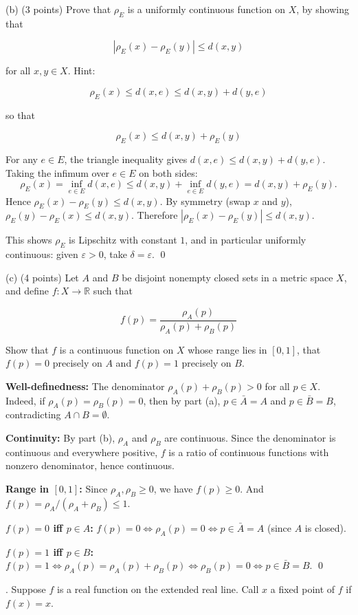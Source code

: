 \documentclass[10pt]{article}
\newcommand{\eps}{\varepsilon}
\newenvironment{solution}{%
  \par\medskip\noindent{\color{red}\textbf{Solution.}}\color{red}\;}%
  {\par\medskip}
\begin{document}
(b) (3 points) Prove that $\rho_{E}$ is a uniformly continuous function on $X$, by showing that

$$
\left|\rho_{E}(x)-\rho_{E}(y)\right| \leq d(x, y)
$$

for all $x, y \in X$. Hint:

$$
\rho_{E}(x) \leq d(x, e) \leq d(x, y)+d(y, e)
$$

so that

$$
\rho_{E}(x) \leq d(x, y)+\rho_{E}(y)
$$

\begin{solution}
For any $e \in E$, the triangle inequality gives $d(x,e) \leq d(x,y) + d(y,e)$. Taking the infimum over $e \in E$ on both sides:
$$
\rho_E(x) = \inf_{e \in E} d(x,e) \leq d(x,y) + \inf_{e\in E} d(y,e) = d(x,y) + \rho_E(y).
$$
Hence $\rho_E(x) - \rho_E(y) \leq d(x,y)$. By symmetry (swap $x$ and $y$), $\rho_E(y) - \rho_E(x) \leq d(x,y)$. Therefore $|\rho_E(x) - \rho_E(y)| \leq d(x,y)$.

This shows $\rho_E$ is Lipschitz with constant $1$, and in particular uniformly continuous: given $\eps > 0$, take $\delta = \eps$. \qed
\end{solution}

(c) (4 points) Let $A$ and $B$ be disjoint nonempty closed sets in a metric space $X$, and define $f: X \rightarrow \mathbb{R}$ such that

$$
f(p)=\frac{\rho_{A}(p)}{\rho_{A}(p)+\rho_{B}(p)}
$$

Show that $f$ is a continuous function on $X$ whose range lies in $[0,1]$, that $f(p)=0$ precisely on $A$ and $f(p)=1$ precisely on $B$.

\begin{solution}
\textbf{Well-definedness:} The denominator $\rho_A(p) + \rho_B(p) > 0$ for all $p \in X$. Indeed, if $\rho_A(p) = \rho_B(p) = 0$, then by part (a), $p \in \bar{A} = A$ and $p \in \bar{B} = B$, contradicting $A \cap B = \emptyset$.

\textbf{Continuity:} By part (b), $\rho_A$ and $\rho_B$ are continuous. Since the denominator is continuous and everywhere positive, $f$ is a ratio of continuous functions with nonzero denominator, hence continuous.

\textbf{Range in $[0,1]$:} Since $\rho_A, \rho_B \geq 0$, we have $f(p) \geq 0$. And $f(p) = \rho_A/(\rho_A+\rho_B) \leq 1$.

\textbf{$f(p) = 0$ iff $p \in A$:} $f(p) = 0 \iff \rho_A(p) = 0 \iff p \in \bar{A} = A$ (since $A$ is closed).

\textbf{$f(p) = 1$ iff $p \in B$:} $f(p) = 1 \iff \rho_A(p) = \rho_A(p)+\rho_B(p) \iff \rho_B(p) = 0 \iff p \in \bar{B} = B$. \qed
\end{solution}
\clearpage
. Suppose $f$ is a real function on the extended real line. Call $x$ a fixed point of $f$ if $f(x)=x$.
\end{document}
